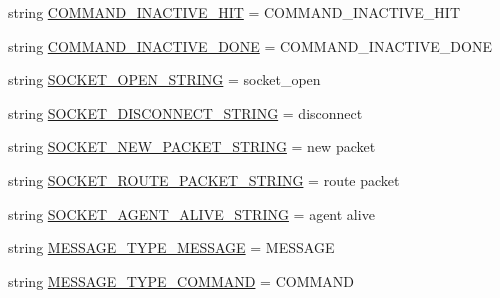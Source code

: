 \begin{DoxyCompactItemize}
\item 
string \hyperlink{namespaceparlai_1_1mturk_1_1core_1_1data__model_a255509dbff42f9646e7b664eddeae44c}{C\+O\+M\+M\+A\+N\+D\+\_\+\+I\+N\+A\+C\+T\+I\+V\+E\+\_\+\+H\+IT} = \textquotesingle{}C\+O\+M\+M\+A\+N\+D\+\_\+\+I\+N\+A\+C\+T\+I\+V\+E\+\_\+\+H\+IT\textquotesingle{}
\item 
string \hyperlink{namespaceparlai_1_1mturk_1_1core_1_1data__model_a1e6085c71fcf2c750a0cbc38918d14db}{C\+O\+M\+M\+A\+N\+D\+\_\+\+I\+N\+A\+C\+T\+I\+V\+E\+\_\+\+D\+O\+NE} = \textquotesingle{}C\+O\+M\+M\+A\+N\+D\+\_\+\+I\+N\+A\+C\+T\+I\+V\+E\+\_\+\+D\+O\+NE\textquotesingle{}
\item 
string \hyperlink{namespaceparlai_1_1mturk_1_1core_1_1data__model_a353667e721f62269dfb9cc4869c6fce5}{S\+O\+C\+K\+E\+T\+\_\+\+O\+P\+E\+N\+\_\+\+S\+T\+R\+I\+NG} = \textquotesingle{}socket\+\_\+open\textquotesingle{}
\item 
string \hyperlink{namespaceparlai_1_1mturk_1_1core_1_1data__model_a44d8ded69f81ae065e53938fdaa6ff34}{S\+O\+C\+K\+E\+T\+\_\+\+D\+I\+S\+C\+O\+N\+N\+E\+C\+T\+\_\+\+S\+T\+R\+I\+NG} = \textquotesingle{}disconnect\textquotesingle{}
\item 
string \hyperlink{namespaceparlai_1_1mturk_1_1core_1_1data__model_ac904c4d3fdc225afd6d12e9cb7bfbed2}{S\+O\+C\+K\+E\+T\+\_\+\+N\+E\+W\+\_\+\+P\+A\+C\+K\+E\+T\+\_\+\+S\+T\+R\+I\+NG} = \textquotesingle{}new packet\textquotesingle{}
\item 
string \hyperlink{namespaceparlai_1_1mturk_1_1core_1_1data__model_a378664c89468818c761c3779056ba191}{S\+O\+C\+K\+E\+T\+\_\+\+R\+O\+U\+T\+E\+\_\+\+P\+A\+C\+K\+E\+T\+\_\+\+S\+T\+R\+I\+NG} = \textquotesingle{}route packet\textquotesingle{}
\item 
string \hyperlink{namespaceparlai_1_1mturk_1_1core_1_1data__model_a31d23a5469b00c1365d2356298eca237}{S\+O\+C\+K\+E\+T\+\_\+\+A\+G\+E\+N\+T\+\_\+\+A\+L\+I\+V\+E\+\_\+\+S\+T\+R\+I\+NG} = \textquotesingle{}agent alive\textquotesingle{}
\item 
string \hyperlink{namespaceparlai_1_1mturk_1_1core_1_1data__model_a61c70a0a282586fc0e09b40ada1f28bf}{M\+E\+S\+S\+A\+G\+E\+\_\+\+T\+Y\+P\+E\+\_\+\+M\+E\+S\+S\+A\+GE} = \textquotesingle{}M\+E\+S\+S\+A\+GE\textquotesingle{}
\item 
string \hyperlink{namespaceparlai_1_1mturk_1_1core_1_1data__model_a6750ce7f276954a237bd83a74170c57f}{M\+E\+S\+S\+A\+G\+E\+\_\+\+T\+Y\+P\+E\+\_\+\+C\+O\+M\+M\+A\+ND} = \textquotesingle{}C\+O\+M\+M\+A\+ND\textquotesingle{}
\end{DoxyCompactItemize}


